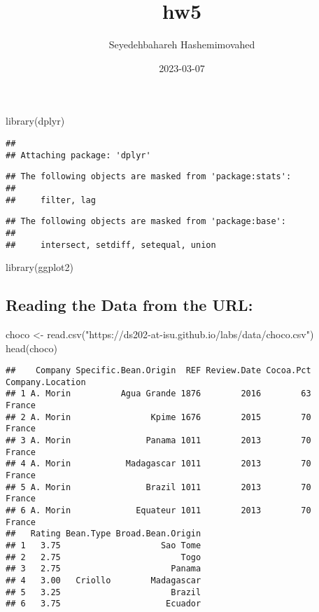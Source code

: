 \documentclass[
]{article}
\title{hw5}
\author{Seyedehbahareh Hashemimovahed}
\date{2023-03-07}
\newenvironment{Shaded}{\begin{snugshade}}{\end{snugshade}}
\newcommand{\FunctionTok}[1]{\textcolor[rgb]{0.00,0.00,0.00}{#1}}
\newcommand{\NormalTok}[1]{#1}
\newcommand{\OtherTok}[1]{\textcolor[rgb]{0.56,0.35,0.01}{#1}}
\newcommand{\StringTok}[1]{\textcolor[rgb]{0.31,0.60,0.02}{#1}}
\begin{document}
\maketitle

\begin{Shaded}
\begin{Highlighting}[]
\FunctionTok{library}\NormalTok{(dplyr)}
\end{Highlighting}
\end{Shaded}

\begin{verbatim}
## 
## Attaching package: 'dplyr'
\end{verbatim}

\begin{verbatim}
## The following objects are masked from 'package:stats':
## 
##     filter, lag
\end{verbatim}

\begin{verbatim}
## The following objects are masked from 'package:base':
## 
##     intersect, setdiff, setequal, union
\end{verbatim}

\begin{Shaded}
\begin{Highlighting}[]
\FunctionTok{library}\NormalTok{(ggplot2)}
\end{Highlighting}
\end{Shaded}

\hypertarget{reading-the-data-from-the-url}{%
\subsection{Reading the Data from the
URL:}\label{reading-the-data-from-the-url}}

\begin{Shaded}
\begin{Highlighting}[]
\NormalTok{choco }\OtherTok{\textless{}{-}} \FunctionTok{read.csv}\NormalTok{(}\StringTok{"https://ds202{-}at{-}isu.github.io/labs/data/choco.csv"}\NormalTok{)}
\FunctionTok{head}\NormalTok{(choco)}
\end{Highlighting}
\end{Shaded}

\begin{verbatim}
##    Company Specific.Bean.Origin  REF Review.Date Cocoa.Pct Company.Location
## 1 A. Morin          Agua Grande 1876        2016        63           France
## 2 A. Morin                Kpime 1676        2015        70           France
## 3 A. Morin               Panama 1011        2013        70           France
## 4 A. Morin           Madagascar 1011        2013        70           France
## 5 A. Morin               Brazil 1011        2013        70           France
## 6 A. Morin             Equateur 1011        2013        70           France
##   Rating Bean.Type Broad.Bean.Origin
## 1   3.75                    Sao Tome
## 2   2.75                        Togo
## 3   2.75                      Panama
## 4   3.00   Criollo        Madagascar
## 5   3.25                      Brazil
## 6   3.75                     Ecuador
\end{verbatim}
\end{document}
